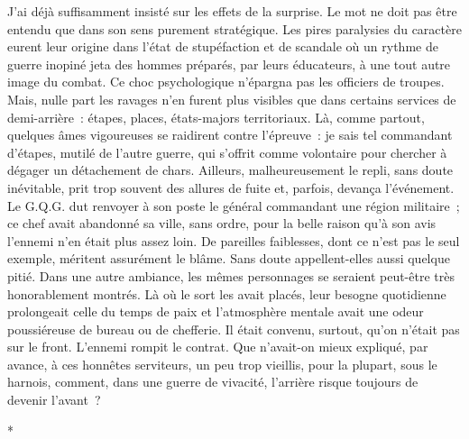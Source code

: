\documentclass[french,twoside]{book} %
\begin{document}
J’ai déjà suffisamment insisté sur les effets de la surprise. Le mot ne doit pas être entendu que dans son sens purement stratégique. Les pires paralysies du caractère eurent leur origine dans l’état de stupéfaction et de scandale où un rythme de guerre inopiné jeta des hommes préparés, par leurs éducateurs, à une tout autre image du combat. Ce choc psychologique n’épargna pas les officiers de troupes. Mais,   nulle part les ravages n’en furent plus visibles que dans certains services de demi-arrière : étapes, places, états-majors territoriaux. Là, comme partout, quelques âmes vigoureuses se raidirent contre l’épreuve : je sais tel commandant d’étapes, mutilé de l’autre guerre, qui s’offrit comme volontaire pour chercher à dégager un détachement de chars. Ailleurs, malheureusement le repli, sans doute inévitable, prit trop souvent des allures de fuite et, parfois, devança l’événement. Le G.Q.G. dut renvoyer à son poste le général commandant une région militaire ; ce chef avait abandonné sa ville, sans ordre, pour la belle raison qu’à son avis l’ennemi n’en était plus assez loin. De pareilles faiblesses, dont ce n’est pas le seul exemple, méritent assurément le blâme. Sans doute appellent-elles aussi quelque pitié. Dans une autre ambiance, les mêmes personnages se seraient peut-être très honorablement montrés. Là où le sort les avait placés, leur besogne quotidienne prolongeait celle du temps de paix et l’atmosphère mentale avait une odeur poussiéreuse de bureau ou de chefferie. Il était convenu, surtout, qu’on n’était pas sur le front. L’ennemi rompit le contrat. Que n’avait-on mieux expliqué, par avance, à ces honnêtes serviteurs, un peu trop vieillis, pour la plupart, sous le harnois, comment, dans une guerre de vivacité, l’arrière risque toujours de devenir l’avant ?\par

\begin{center}
*\par
\end{center}
\end{document}
